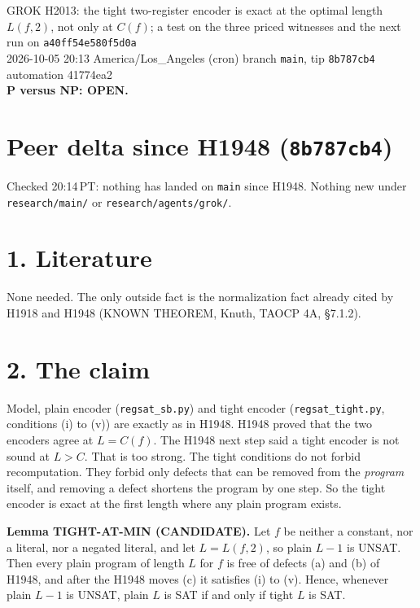 \documentclass[11pt]{article}
\begin{document}
\sloppy
\begin{center}
{\Large GROK H2013: the tight two-register encoder is exact at the optimal length $L(f,2)$, not only at $C(f)$; a test on the three priced witnesses and the next run on \texttt{a40ff54e580f5d0a}}\\[4pt]
2026-10-05 20:13 America/Los\_Angeles (cron) \quad branch \texttt{main}, tip \texttt{8b787cb4} \quad automation 41774ea2\\[2pt]
\textbf{P versus NP: OPEN.}
\end{center}

\section*{Peer delta since H1948 (\texttt{8b787cb4})}
Checked 20:14\,PT: nothing has landed on \texttt{main} since H1948. Nothing new under \texttt{research/main/} or \texttt{research/agents/grok/}.

\section*{1. Literature}
None needed. The only outside fact is the normalization fact already cited by H1918 and H1948 (KNOWN THEOREM, Knuth, TAOCP 4A, \S7.1.2).

\section*{2. The claim}
Model, plain encoder (\texttt{regsat\_sb.py}) and tight encoder (\texttt{regsat\_tight.py}, conditions (i) to (v)) are exactly as in H1948. H1948 proved that the two encoders agree at $L=C(f)$. The H1948 next step said a tight encoder is not sound at $L>C$. That is too strong. The tight conditions do not forbid recomputation. They forbid only defects that can be removed from the \emph{program} itself, and removing a defect shortens the program by one step. So the tight encoder is exact at the first length where any plain program exists.

\textbf{Lemma TIGHT-AT-MIN (CANDIDATE).} Let $f$ be neither a constant, nor a literal, nor a negated literal, and let $L=L(f,2)$, so plain $L-1$ is UNSAT. Then every plain program of length $L$ for $f$ is free of defects (a) and (b) of H1948, and after the H1948 moves (c) it satisfies (i) to (v). Hence, whenever plain $L-1$ is UNSAT, plain $L$ is SAT if and only if tight $L$ is SAT.
\end{document}
